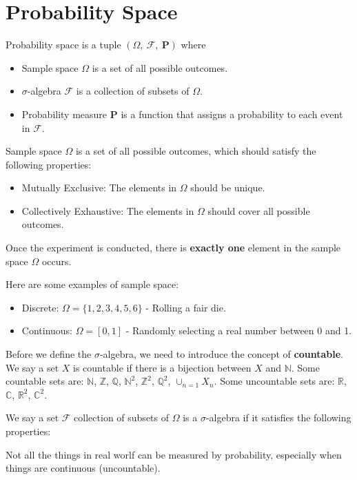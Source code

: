 \section{Probability Space}
\begin{definition}
    Probability space is a tuple $\left(\varOmega,~\mathcal{F},~\mathbf{P}\right)$ where
    \begin{itemize}
        \item Sample space $\varOmega$ is a set of all possible outcomes.
        \item $ \sigma $-algebra $\mathcal{F}$ is a collection of subsets of $\varOmega$.
        \item Probability measure $\mathbf{P}$ is a function that assigns a probability to each event in $\mathcal{F}$.
    \end{itemize}
\end{definition}

\begin{definition}
    Sample space $\varOmega$ is a set of all possible outcomes, which should satisfy the following properties:
    \begin{itemize}
        \item Mutually Exclusive: The elements in $\varOmega$ should be unique.
        \item Collectively Exhaustive: The elements in $\varOmega$ should cover all possible outcomes.
    \end{itemize}
\end{definition}

Once the experiment is conducted, there is \textbf{exactly one} element in the sample space $\varOmega$ occurs.

\begin{example}
    Here are some examples of sample space:
    \begin{itemize}
        \item Discrete: $\varOmega = \{1, 2, 3, 4, 5, 6\}$ - Rolling a fair die.
        \item Continuous: $\varOmega = [0, 1]$ - Randomly selecting a real number between 0 and 1.
    \end{itemize}
\end{example}

Before we define the $\sigma$-algebra, we need to introduce the concept of \textbf{countable}. We say a set $X$ is countable if there is a bijection between $X$ and $\mathbb{N}$. Some countable sets are: $\mathbb{N}$, $\mathbb{Z}$, $\mathbb{Q}$, $\mathbb{N}^2$, $\mathbb{Z}^2$, $\mathbb{Q}^2$, $\cup_{n=1}X_{n}$. Some uncountable sets are: $\mathbb{R}$, $\mathbb{C}$, $\mathbb{R}^2$, $\mathbb{C}^2$.

\begin{definition}
    We say a set $\mathcal{F}$  collection of subsets of $\varOmega$ is a $\sigma$-algebra if it satisfies the following properties:
\end{definition}

\begin{remark}
    Not all the things in real worlf can be measured by probability, especially when things are continuous (uncountable).
\end{remark}
